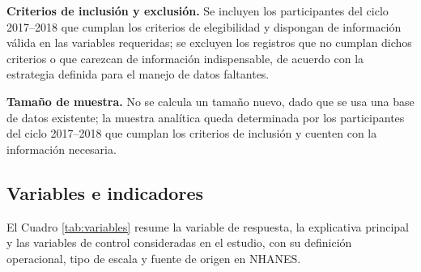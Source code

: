 \documentclass[
  spanish,
  12pt,
]{article}
\begin{document}
\textbf{Criterios de inclusión y exclusión.} Se incluyen los participantes
del ciclo 2017--2018 que cumplan los criterios de elegibilidad y
dispongan de información válida en las variables requeridas; se
excluyen los registros que no cumplan dichos criterios o que carezcan
de información indispensable, de acuerdo con la estrategia definida
para el manejo de datos faltantes.

\textbf{Tamaño de muestra.} No se calcula un tamaño nuevo, dado que se usa
una base de datos existente; la muestra analítica queda determinada por
los participantes del ciclo 2017--2018 que cumplan los criterios de
inclusión y cuenten con la información necesaria.

\subsection{Variables e indicadores}\label{variables-e-indicadores}

El Cuadro \ref{tab:variables} resume la variable de respuesta, la explicativa principal y
las variables de control consideradas en el estudio, con su definición
operacional, tipo de escala y fuente de origen en NHANES.
\end{document}
